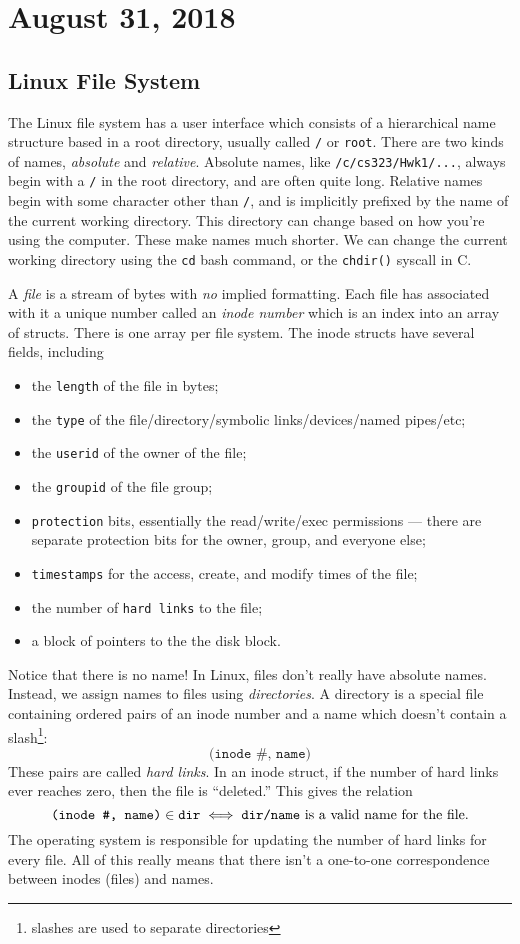 \section{August 31, 2018}

\subsection*{Linux File System}

The Linux file system has a user interface which consists of a hierarchical name structure based in a root directory, usually called \texttt{/} or \texttt{root}. There are two kinds of names, \emph{absolute} and \emph{relative}. Absolute names, like \texttt{/c/cs323/Hwk1/...}, always begin with a \texttt{/} in the root directory, and are often quite long. Relative names begin with some character other than \texttt{/}, and is implicitly prefixed by the name of the current working directory. This directory can change based on how you're using the computer. These make names much shorter. We can change the current working directory using the \texttt{cd} bash command, or the \texttt{chdir()} syscall in C.

A \emph{file} is a stream of bytes with \emph{no} implied formatting. Each file has associated with it a unique number called an \emph{inode number} which is an index into an array of structs. There is one array per file system. The inode structs have several fields, including
\begin{itemize}
\item the \texttt{length} of the file in bytes;
\item the \texttt{type} of the file/directory/symbolic links/devices/named pipes/etc;
\item the \texttt{userid} of the owner of the file;
\item the \texttt{groupid} of the file group;
\item \texttt{protection} bits, essentially the read/write/exec permissions --- there are separate protection bits for the owner, group, and everyone else;
\item \texttt{timestamps} for the access, create, and modify times of the file;
\item the number of \texttt{hard links} to the file;
\item a block of pointers to the the disk block.
\end{itemize}
Notice that there is no name! In Linux, files don't really have absolute names. Instead, we assign names to files using \emph{directories}. A directory is a special file containing ordered pairs of an inode number and a name which doesn't contain a slash\footnote{slashes are used to separate directories}:
\[ \texttt{(inode \#, name)} \]
These pairs are called \emph{hard links}. In an inode struct, if the number of hard links ever reaches zero, then the file is ``deleted.'' This gives the relation 
\[ \texttt{(inode \#, name)} \in \texttt{dir} \iff \text{\texttt{dir/name} is a valid name for the file}. \]
The operating system is responsible for updating the number of hard links for every file. All of this really means that there isn't a one-to-one correspondence between inodes (files) and names.

